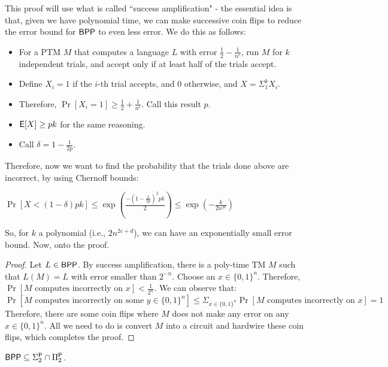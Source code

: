 This proof will use what is called ``success amplification" - the essential idea is that, given we have polynomial time, we can make successive coin flips to reduce the error bound for ${\mathsf{BPP}}$ to even less error. We do this as follows:
\begin{itemize}
\item For a PTM $M$ that computes a language $L$ with error $\frac{1}{2} - \frac{1}{n^c}$, run $M$ for $k$ independent trials, and accept only if at least half of the trials accept. 
\item Define $X_i = 1$ if the $i$-th trial accepts, and 0 otherwise, and $X = \Sigma_1^k X_i$. 
\item Therefore, $\Pr[X_i = 1] \ge \frac{1}{2} + \frac{1}{n^c}$. Call this result $p$.
\item ${\mathsf{E}}[X] \ge pk$ for the same reasoning.
\item Call $\delta = 1-\frac{1}{2p}$.
\end{itemize}
Therefore, now we want to find the probability that the trials done above are incorrect, by using Chernoff bounds:
\begin{center}
$\Pr[X < (1-\delta)pk] \le \exp(\frac{-{(1-\frac{1}{2p})^2}pk}{2}) \le \exp(-\frac{k}{2n^{2c}})$
\end{center}
So, for $k$ a polynomial (i.e., $2n^{2c+d}$), we can have an exponentially small error bound. Now, onto the proof.

\begin{proof}
Let $L \in {\ensuremath{\mathsf{BPP}}}$. By success amplification, there is a poly-time TM $M$ such that $L(M) = L$ with error smaller than $2^{-n}$. Choose an $x \in \{0, 1\}^n$. Therefore, $\Pr[\text{$M$ computes incorrectly on $x$}] < \frac{1}{2^n}$. We can observe that:
\[
\Pr[\text{$M$ computes incorrectly on some $y \in \{0, 1\}^n$}] \le \Sigma_{x \in \{0, 1\}^n} \Pr[\text{$M$ computes incorrectly on $x$}] = 1
\]
Therefore, there are some coin flips where $M$ does not make any error on any $x \in \{0, 1\}^n$. All we need to do is convert $M$ into a circuit and hardwire these coin flips, which completes the proof. 
\end{proof}

\begin{theorem}[Sipser-G\'{a}cs]
${\mathsf{BPP}} \subseteq \Sigma_2^{\mathsf{P}} \cap \Pi_2^{\mathsf{P}}$.
\end{theorem}

